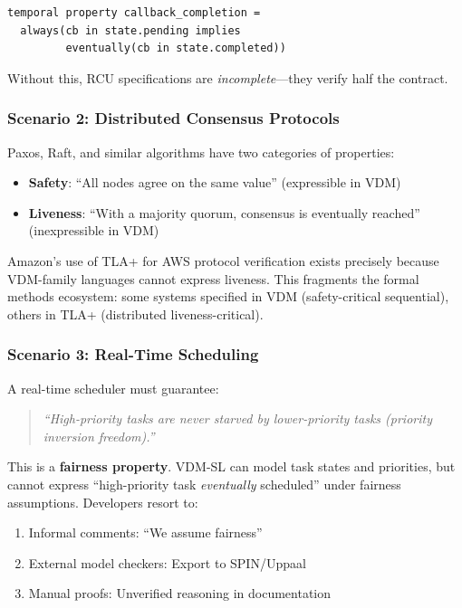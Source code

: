 \documentclass[11pt]{article}
\begin{document}
\begin{lstlisting}
temporal property callback_completion =
  always(cb in state.pending implies
         eventually(cb in state.completed))
\end{lstlisting}

Without this, RCU specifications are \textit{incomplete}---they verify half the contract.

\subsubsection{Scenario 2: Distributed Consensus Protocols}

Paxos, Raft, and similar algorithms have two categories of properties:

\begin{itemize}
\item \textbf{Safety}: ``All nodes agree on the same value'' (expressible in VDM)
\item \textbf{Liveness}: ``With a majority quorum, consensus is eventually reached'' (inexpressible in VDM)
\end{itemize}

Amazon's use of TLA+ for AWS protocol verification \cite{newcombe2015} exists precisely because VDM-family languages cannot express liveness. This fragments the formal methods ecosystem: some systems specified in VDM (safety-critical sequential), others in TLA+ (distributed liveness-critical).

\subsubsection{Scenario 3: Real-Time Scheduling}

A real-time scheduler must guarantee:

\begin{quote}
\textit{``High-priority tasks are never starved by lower-priority tasks (priority inversion freedom).''}
\end{quote}

This is a \textbf{fairness property}. VDM-SL can model task states and priorities, but cannot express ``high-priority task \textit{eventually} scheduled'' under fairness assumptions. Developers resort to:

\begin{enumerate}
\item Informal comments: ``We assume fairness''
\item External model checkers: Export to SPIN/Uppaal
\item Manual proofs: Unverified reasoning in documentation
\end{enumerate}
\end{document}
